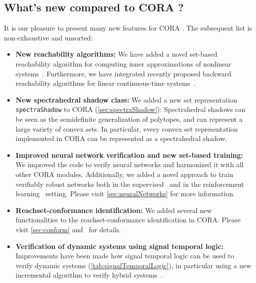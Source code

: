 \subsection{What's new compared to CORA \lastCORAVERSION?}

It is our pleasure to present many new features for CORA \CORAVERSION.
The subsequent list is non-exhaustive and unsorted:

\begin{itemize}

	\item \textbf{New reachability algorithms:}
		We have added a novel set-based reachability algorithm for computing inner approximations of nonlinear systems~\cite{Wetzlinger2024CSL}.
		Furthermore, we have integrated recently proposed backward reachability algorithms for linear continuous-time systems~\cite{Wetzlinger2024arXiv}.

	\item \textbf{New spectrahedral shadow class:}
		We added a new set representation \texttt{spectraShadow} to CORA (\cref{sec:spectraShadow}):
		Spectrahedral shadows can be seen as the semidefinite generalization of polytopes,
		and can represent a large variety of convex sets.
		In particular, every convex set representation implemented in CORA can be represented as a spectrahedral shadow.

	\item \textbf{Improved neural network verification and new set-based training:}
		We improved the code to verify neural networks and harmonized it with all other CORA modules.
		Additionally, we added a novel approach to train verifiably robust networks both in the supervised~\cite{koller2024a} and in the reinforcement learning~\cite{Wendl2024a} setting.
		Please visit \cref{sec:neuralNetworks} for more information.

	\item \textbf{Reachset-conformance identification:}
		We added several new functionalities to the reachset-conformance identification in CORA.
		Please visit \cref{sec:conform} and~\cite{Luetzow2024a,Luetzow2024b} for details.

	\item \textbf{Verification of dynamic systems using signal temporal logic:}
		Improvements have been made how signal temporal logic can be used to verify dynamic systems (\cref{tab:signalTemporalLogic}),
		in particular using a new incremental algorithm to verify hybrid systems~\cite{Lercher2024}.


\end{itemize}
